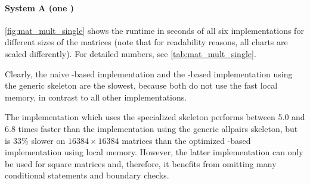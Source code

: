 \paragraph{System A (one \GPU)}
\autoref{fig:mat_mult_single} shows the runtime in seconds of all six implementations for different sizes of the matrices (note that for readability reasons, all charts are scaled differently).
For detailed numbers, see \autoref{tab:mat_mult_single}.

Clearly, the naive \OpenCL-based implementation and the \SkelCL-based implementation using the generic \allpairs skeleton are the slowest, because both do not use the fast \GPU local memory, in contrast to all other implementations.

The implementation which uses the specialized \allpairs skeleton performs between 5.0 and 6.8 times faster than the implementation using the generic allpairs skeleton, but is 33\% slower on $16384\times 16384$ matrices than the optimized \OpenCL-based implementation using local memory.
However, the latter implementation can only be used for square matrices and, therefore, it benefits from omitting many conditional statements and boundary checks.

